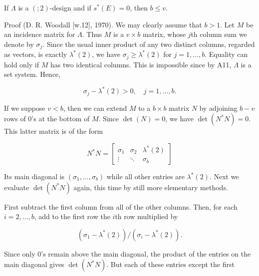 If $\Lambda$ is a $(; 2)$-design and if $s^*(E) = 0$, then $b \leq v$.

Proof (D. R. Woodall [w.12], 1970). We may clearly assume that $b > 1$. Let $M$ be an incidence matrix for $\Lambda$. Thus $M$ is a $v \times b$ matrix, whose $j$th column sum we denote by $\sigma_j$. Since the usual inner product of any two distinct columns, regarded as vectors, is exactly $\lambda^*(2)$, we have $\sigma_j \geq \lambda^*(2)$ for $j = 1, \ldots, b$. Equality can hold only if $M$ has two identical columns. This is impossible since by A11, $\Lambda$ is a set system. Hence,

$$\sigma_j - \lambda^*(2) > 0, \quad j = 1, \ldots, b.$$

If we suppose $v < b$, then we can extend $M$ to a $b \times b$ matrix $N$ by adjoining $b - v$ rows of 0's at the bottom of $M$. Since $\det(N) = 0$, we have $\det(N^*N) = 0$. This latter matrix is of the form

$$N^*N = \begin{bmatrix}
\sigma_1 & \sigma_2 & \lambda^*(2) \\
\vdots & \ddots & \sigma_b
\end{bmatrix}$$

Its main diagonal is $(\sigma_1, \ldots, \sigma_b)$ while all other entries are $\lambda^*(2)$. Next we evaluate $\det(N^*N)$ again, this time by still more elementary methods.

First subtract the first column from all of the other columns. Then, for each $i = 2, \ldots, b$, add to the first row the $i$th row multiplied by

$$(\sigma_1 - \lambda^*(2)) / (\sigma_i - \lambda^*(2)).$$

Since only 0's remain above the main diagonal, the product of the entries on the main diagonal gives $\det(N^*N)$. But each of these entries except the first
